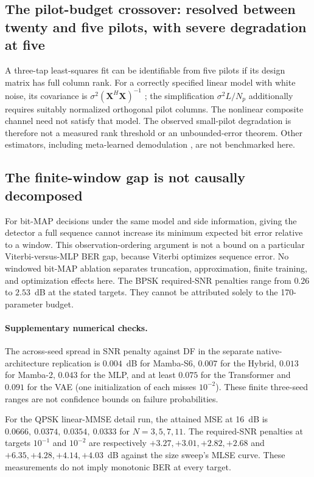 \subsection{The pilot-budget crossover: resolved between twenty and five pilots, with severe degradation at five}

A three-tap least-squares fit can be identifiable from five pilots if its design matrix has full column rank. For a correctly specified linear model with white noise, its covariance is $\sigma^2(\mathbf X^H\mathbf X)^{-1}$ \cite{Kay1993Estimation}; the simplification $\sigma^2 L/N_p$ additionally requires suitably normalized orthogonal pilot columns. The nonlinear composite channel need not satisfy that model. The observed small-pilot degradation is therefore not a measured rank threshold or an unbounded-error theorem. Other estimators, including meta-learned demodulation \cite{ParkSimeone2021MetaDemod}, are not benchmarked here.

\subsection{The finite-window gap is not causally decomposed}

For bit-MAP decisions under the same model and side information, giving the detector a full sequence cannot increase its minimum expected bit error relative to a window. This observation-ordering argument is not a bound on a particular Viterbi-versus-MLP BER gap, because Viterbi optimizes sequence error. No windowed bit-MAP ablation separates truncation, approximation, finite training, and optimization effects here. The BPSK required-SNR penalties range from $0.26$ to $2.53$~dB at the stated targets. They cannot be attributed solely to the 170-parameter budget.

\paragraph{Supplementary numerical checks.} The across-seed spread in SNR penalty against DF in the separate native-architecture replication is $0.004$~dB for Mamba-S6, $0.007$ for the Hybrid, $0.013$ for Mamba-2, $0.043$ for the MLP, and at least $0.075$ for the Transformer and $0.091$ for the VAE (one initialization of each misses $10^{-2}$). These finite three-seed ranges are not confidence bounds on failure probabilities.

For the QPSK linear-MMSE detail run, the attained MSE at 16~dB is $0.0666,\allowbreak\ 0.0374,\allowbreak\ 0.0354,\allowbreak\ 0.0333$ for $N=3,5,7,11$. The required-SNR penalties at targets $10^{-1}$ and $10^{-2}$ are respectively $+3.27, +3.01, +2.82, +2.68$ and $+6.35, +4.28, +4.14, +4.03$~dB against the size sweep's MLSE curve. These measurements do not imply monotonic BER at every target.

